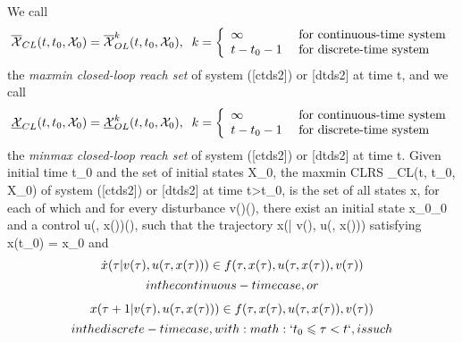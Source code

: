 \documentclass[letterpaper,10pt,english]{sphinxmanual}
\begin{document}
We call
\begin{gather}
\begin{split}\overline{{\mathcal X}}_{CL}(t, t_0, {\mathcal X}_0) = \overline{{\mathcal X}}_{OL}^k(t, t_0, {\mathcal X}_0), \;\;
k = \left\{\begin{array}{ll}
\infty & \mbox{ for continuous-time system}\\
t-t_0-1 & \mbox{ for discrete-time system}\end{array}\right.
\label{maxminclrs}\end{split}\notag
\end{gather}
the \emph{maxmin closed-loop reach set} of system ({[}ctds2{]}) or {[}dtds2{]} at
time t, and we call
\begin{gather}
\begin{split}\underline{{\mathcal X}}_{CL}(t, t_0, {\mathcal X}_0) = \underline{{\mathcal X}}_{OL}^k(t, t_0, {\mathcal X}_0), \;\;
k = \left\{\begin{array}{ll}
\infty & \mbox{ for continuous-time system}\\
t-t_0-1 & \mbox{ for discrete-time system}\end{array}\right.
\label{minmaxclrs}\end{split}\notag
\end{gather}
the \emph{minmax closed-loop reach set} of system ({[}ctds2{]}) or {[}dtds2{]} at
time t. Given initial time t_0 and the set of initial
states {\mathcal X}_0, the maxmin CLRS
_{CL}(t, t_0, {\mathcal X}_0) of system
({[}ctds2{]}) or {[}dtds2{]} at time t>t_0, is the set of all states
x, for each of which and for every disturbance
v(\tau)(\tau), there exist an initial state
x_0_0 and a control
u(\tau, x(\tau))(\tau), such that the trajectory
x(\tau | v(\tau), u(\tau, x(\tau))) satisfying
x(t_0) = x_0 and
\begin{gather}
\begin{split}  \dot{x}(\tau | v(\tau), u(\tau, x(\tau))) \in
  f(\tau, x(\tau), u(\tau, x(\tau)), v(\tau))\end{split}\notag\\\begin{split}in the continuous-time case, or\end{split}\notag
\end{gather}\begin{gather}
\begin{split}  x(\tau+1 | v(\tau), u(\tau, x(\tau))) \in
  f(\tau, x(\tau), u(\tau, x(\tau)), v(\tau))\end{split}\notag\\\begin{split}in the discrete-time case, with :math:`t_0\leqslant\tau<t`, is such\end{split}\notag
\end{gather}
\end{document}
